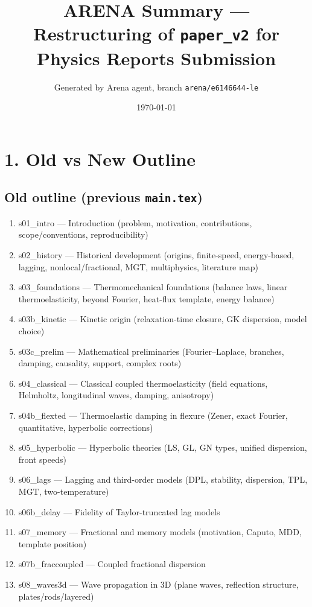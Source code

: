 \documentclass[12pt,a4paper]{article}
\title{\bfseries ARENA Summary --- Restructuring of {\tt paper\_v2} for Physics Reports Submission}
\author{Generated by Arena agent, branch {\tt arena/e6146644-le}}
\date{\today}
\begin{document}
\maketitle

\section*{1. Old vs New Outline}

\subsection*{Old outline (previous {\tt main.tex})}
\begin{enumerate}[nosep,leftmargin=1.6em]
\item s01\_intro --- Introduction (problem, motivation, contributions, scope/conventions, reproducibility)
\item s02\_history --- Historical development (origins, finite-speed, energy-based, lagging, nonlocal/fractional, MGT, multiphysics, literature map)
\item s03\_foundations --- Thermomechanical foundations (balance laws, linear thermoelasticity, beyond Fourier, heat-flux template, energy balance)
\item s03b\_kinetic --- Kinetic origin (relaxation-time closure, GK dispersion, model choice)
\item s03c\_prelim --- Mathematical preliminaries (Fourier--Laplace, branches, damping, causality, support, complex roots)
\item s04\_classical --- Classical coupled thermoelasticity (field equations, Helmholtz, longitudinal waves, damping, anisotropy)
\item s04b\_flexted --- Thermoelastic damping in flexure (Zener, exact Fourier, quantitative, hyperbolic corrections)
\item s05\_hyperbolic --- Hyperbolic theories (LS, GL, GN types, unified dispersion, front speeds)
\item s06\_lags --- Lagging and third-order models (DPL, stability, dispersion, TPL, MGT, two-temperature)
\item s06b\_delay --- Fidelity of Taylor-truncated lag models
\item s07\_memory --- Fractional and memory models (motivation, Caputo, MDD, template position)
\item s07b\_fraccoupled --- Coupled fractional dispersion
\item s08\_waves3d --- Wave propagation in 3D (plane waves, reflection structure, plates/rods/layered)

\end{enumerate}
\end{document}
